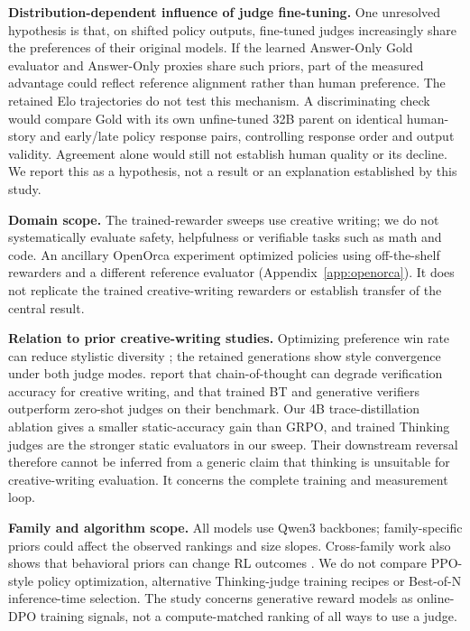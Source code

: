 \documentclass[11pt,letterpaper]{article}
\begin{document}
\textbf{Distribution-dependent influence of judge fine-tuning.} One unresolved hypothesis is that, on shifted policy outputs, fine-tuned judges increasingly share the preferences of their original models. If the learned Answer-Only Gold evaluator and Answer-Only proxies share such priors, part of the measured advantage could reflect reference alignment rather than human preference. The retained Elo trajectories do not test this mechanism. A discriminating check would compare Gold with its own unfine-tuned 32B parent on identical human-story and early/late policy response pairs, controlling response order and output validity. Agreement alone would still not establish human quality or its decline. We report this as a hypothesis, not a result or an explanation established by this study.

\textbf{Domain scope.} The trained-rewarder sweeps use creative writing; we do not systematically evaluate safety, helpfulness or verifiable tasks such as math and code. An ancillary OpenOrca experiment optimized policies using off-the-shelf rewarders and a different reference evaluator (Appendix~\ref{app:openorca}). It does not replicate the trained creative-writing rewarders or establish transfer of the central result.

\textbf{Relation to prior creative-writing studies.} Optimizing preference win rate can reduce stylistic diversity \citep{chung2025diverse}; the retained generations show style convergence under both judge modes. \citet{fein2025litbench} report that chain-of-thought can degrade verification accuracy for creative writing, and that trained BT and generative verifiers outperform zero-shot judges on their benchmark. Our 4B trace-distillation ablation gives a smaller static-accuracy gain than GRPO, and trained Thinking judges are the stronger static evaluators in our sweep. Their downstream reversal therefore cannot be inferred from a generic claim that thinking is unsuitable for creative-writing evaluation. It concerns the complete training and measurement loop.

\textbf{Family and algorithm scope.} All models use Qwen3 backbones; family-specific priors could affect the observed rankings and size slopes. Cross-family work also shows that behavioral priors can change RL outcomes \citep{gandhi2025stars}. We do not compare PPO-style policy optimization, alternative Thinking-judge training recipes or Best-of-N inference-time selection. The study concerns generative reward models as online-DPO training signals, not a compute-matched ranking of all ways to use a judge.
\end{document}
